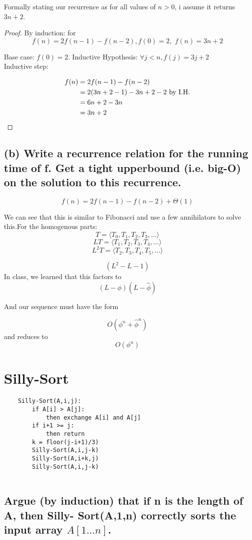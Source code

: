 \documentclass[titlepage]{article}\usepackage[]{graphicx}\usepackage[]{color}
\begin{document}
Formally stating our recurrence as 
for all values of $n > 0$,  i assume it returns $3n+2$. 
\begin{proof} By induction: for 
\[ f(n) = 2f(n-1) - f(n-2) , f(0) = 2,\,\, f(n) = 3n +2 \]

Base case: $f(0) = 2$.  
Inductive Hypothesis: $\forall j < n, f(j) = 3j + 2 $ \\
Inductive step: 

\begin{align*}
	f(n) &= 2f(n-1) - f(n-2) \\
	&= 2(3n + 2 -1) - 3n+2-2 \text{ by I.H.} \\
	&= 6n + 2 - 3n \\
	&= 3n + 2 \qedhere
\end{align*}
\end{proof}


\subsection{(b) Write a recurrence relation for the running time of f. Get a tight
upperbound (i.e. big-O) on the solution to this recurrence.}

\[ f(n) = 2f(n-1) - f(n-2) + \Theta(1) \]

We can see that this is similar to Fibonacci and use a few annihilators to
solve this.For the homogenous parts:
\[ T = \langle T_0, T_1, T_2, T_3, \ldots \rangle \]
\[ LT = \langle T_1, T_2, T_3, T_4, \ldots \rangle \]
\[ L^2T = \langle T_2, T_3, T_4, T_5, \ldots \rangle \]

\[ (L^2 - L - 1) \] 
In class, we learned that this factors to \[ (L	 - \phi)(L - \hat{\phi} ) \]

And our sequence must have the form 

\[ O(\phi^n + \hat{\phi}^n) \]
and reduces to 
\[ O(\phi^n) \]
\section{Silly-Sort }
\begin{lstlisting}
	Silly-Sort(A,i,j):
		if A[i] > A[j]:
			then exchange A[i] and A[j]
		if i+1 >= j:
			then return
		k = floor(j-i+1)/3)
		Silly-Sort(A,i,j-k)
		Silly-Sort(A,i+k,j)
		Silly-Sort(A,i,j-k)
	
\end{lstlisting}

\subsection{ Argue (by induction) that if n is the
length of A, then Silly- Sort(A,1,n)
correctly sorts the input array
$A[1\dots n]$.}
\end{document}

